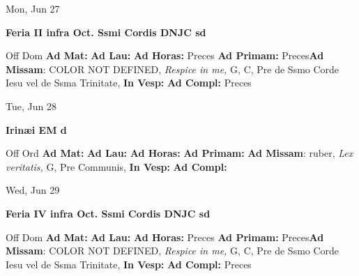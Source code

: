 \documentclass[10pt]{book}
\begin{document}
\begin{center}
\begin{minipage}{3.5in}
\vspace{2em}
\begin{center}Mon, Jun 27
\end{center}
\textbf{ \large Feria II infra Oct. Ssmi Cordis DNJC
\textnormal{\normalsize sd}}

\begin{justify}Off Dom
\textbf{Ad Mat: }
\textbf{Ad Lau: }
\textbf{Ad Horas: }Preces
\textbf{Ad Primam: }Preces\textbf{Ad Missam}: COLOR NOT DEFINED, \textit{Respice in me,} G, C, Pre de Ssmo Corde Iesu vel de Ssma Trinitate, 
\textbf{In Vesp: }
\textbf{Ad Compl: }Preces
\end{justify}
\end{minipage}
\end{center}

\begin{center}
\begin{minipage}{3.5in}
\vspace{2em}
\begin{center}Tue, Jun 28
\end{center}
\textbf{ \large Irinæi EM
\textnormal{\normalsize d}}

\begin{justify}Off Ord
\textbf{Ad Mat: }
\textbf{Ad Lau: }
\textbf{Ad Horas: }
\textbf{Ad Primam: }\textbf{Ad Missam}: ruber, \textit{Lex veritatis,} G, Pre Communis, 
\textbf{In Vesp: }
\textbf{Ad Compl: }
\end{justify}
\end{minipage}
\end{center}

\begin{center}
\begin{minipage}{3.5in}
\vspace{2em}
\begin{center}Wed, Jun 29
\end{center}
\textbf{ \large Feria IV infra Oct. Ssmi Cordis DNJC
\textnormal{\normalsize sd}}

\begin{justify}Off Dom
\textbf{Ad Mat: }
\textbf{Ad Lau: }
\textbf{Ad Horas: }Preces
\textbf{Ad Primam: }Preces\textbf{Ad Missam}: COLOR NOT DEFINED, \textit{Respice in me,} G, C, Pre de Ssmo Corde Iesu vel de Ssma Trinitate, 
\textbf{In Vesp: }
\textbf{Ad Compl: }Preces
\end{justify}
\end{minipage}
\end{center}
\end{document}
